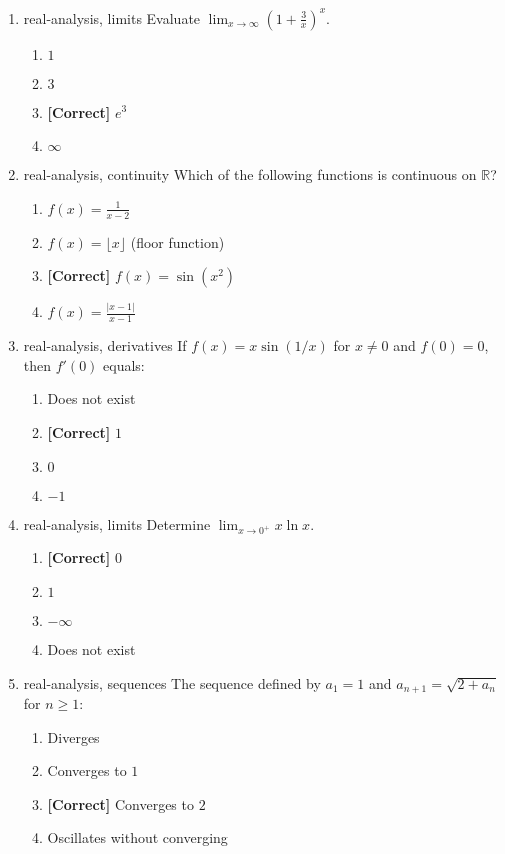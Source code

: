 \documentclass{article}
\newenvironment{problem}{\item}{}
\newcommand{\choice}{\item}
\newcommand{\correctchoice}{\item \textbf{[Correct] }}
\newcommand{\tags}[1]{#1} %
\begin{document}
\begin{enumerate}
        \begin{problem}
            \tags{real-analysis, limits}
            Evaluate $\lim_{x \to \infty} \left(1 + \frac{3}{x}\right)^x$.
            \begin{enumerate}
                \choice $1$
                \choice $3$
                \correctchoice $e^3$
                \choice $\infty$
            \end{enumerate}
        \end{problem}
        
        \begin{problem}
            \tags{real-analysis, continuity}
            Which of the following functions is continuous on $\mathbb{R}$?
            \begin{enumerate}
                \choice $f(x) = \frac{1}{x-2}$
                \choice $f(x) = \lfloor x \rfloor$ (floor function)
                \correctchoice $f(x) = \sin(x^2)$
                \choice $f(x) = \frac{|x-1|}{x-1}$
            \end{enumerate}
        \end{problem}
        
        \begin{problem}
            \tags{real-analysis, derivatives}
            If $f(x) = x\sin(1/x)$ for $x \neq 0$ and $f(0) = 0$, then $f'(0)$ equals:
            \begin{enumerate}
                \choice Does not exist
                \correctchoice $1$
                \choice $0$
                \choice $-1$
            \end{enumerate}
        \end{problem}
        
        \begin{problem}
            \tags{real-analysis, limits}
            Determine $\lim_{x \to 0^+} x\ln x$.
            \begin{enumerate}
                \correctchoice $0$
                \choice $1$
                \choice $-\infty$
                \choice Does not exist
            \end{enumerate}
        \end{problem}
        
        \begin{problem}
            \tags{real-analysis, sequences}
            The sequence defined by $a_1 = 1$ and $a_{n+1} = \sqrt{2+a_n}$ for $n \geq 1$:
            \begin{enumerate}
                \choice Diverges
                \choice Converges to $1$
                \correctchoice Converges to $2$
                \choice Oscillates without converging
            \end{enumerate}
        \end{problem}
        

\end{enumerate}
\end{document}

